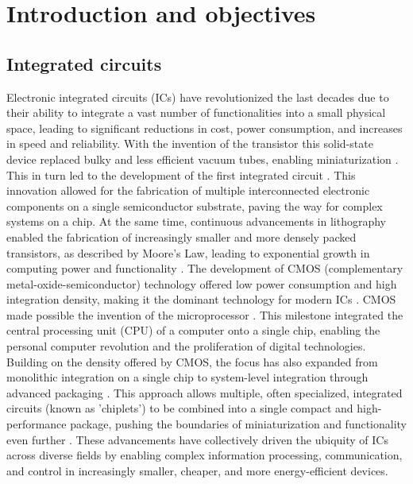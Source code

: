 
\chapter{Introduction and objectives} \label{chap:intro}

\section{Integrated circuits} \label{sec:integrated_circuits}

Electronic integrated circuits (ICs) have revolutionized the last decades due to their ability to integrate a vast number of functionalities into a small physical space, leading to significant reductions in cost, power consumption, and increases in speed and reliability.
With the invention of the transistor this solid-state device replaced bulky and less efficient vacuum tubes, enabling miniaturization \cite{bardeen_transistor_1948}.
This in turn led to the development of the first integrated circuit \cite{kilby_invention_1976, riordan_crystal_1997}.
This innovation allowed for the fabrication of multiple interconnected electronic components on a single semiconductor substrate, paving the way for complex systems on a chip.
At the same time, continuous advancements in lithography enabled the fabrication of increasingly smaller and more densely packed transistors, as described by Moore's Law, leading to exponential growth in computing power and functionality \cite{moore_cramming_2006}.
The development of CMOS (complementary metal-oxide-semiconductor) technology offered low power consumption and high integration density, making it the dominant technology for modern ICs \cite{wanlass_low_1967}.
CMOS made possible the invention of the microprocessor \cite{noauthor_announcing_nodate}.
This milestone integrated the central processing unit (CPU) of a computer onto a single chip, enabling the personal computer revolution and the proliferation of digital technologies.
Building on the density offered by CMOS, the focus has also expanded from monolithic integration on a single chip to system-level integration through advanced packaging \cite{tummala_fundamentals_2001}.
This approach allows multiple, often specialized, integrated circuits (known as 'chiplets') to be combined into a single compact and high-performance package, pushing the boundaries of miniaturization and functionality even further \cite{naffziger_22_2020}.
These advancements have collectively driven the ubiquity of ICs across diverse fields by enabling complex information processing, communication, and control in increasingly smaller, cheaper, and more energy-efficient devices.


